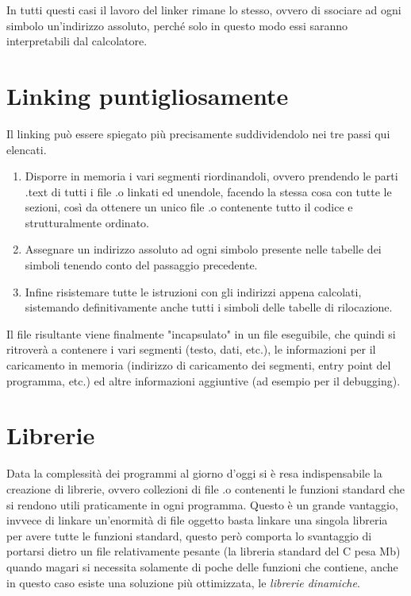 \documentclass[class=book, crop=false, oneside]{standalone}
\begin{document}
In tutti questi casi il lavoro del linker rimane lo stesso, ovvero di ssociare ad ogni simbolo un'indirizzo assoluto, perché solo in questo modo essi saranno interpretabili dal calcolatore.

\section{Linking puntigliosamente}
Il linking può essere spiegato più precisamente suddividendolo nei tre passi qui elencati.
\begin{enumerate}
	\item Disporre in memoria i vari segmenti riordinandoli, ovvero prendendo le parti .text di tutti i file .o linkati ed unendole, facendo la stessa cosa con tutte le sezioni, così da ottenere un unico file .o contenente tutto il codice e strutturalmente ordinato.
	\item Assegnare un indirizzo assoluto ad ogni simbolo presente nelle tabelle dei simboli tenendo conto del passaggio precedente.
	\item Infine risistemare tutte le istruzioni con gli indirizzi appena calcolati, sistemando definitivamente anche tutti i simboli delle tabelle di rilocazione.
\end{enumerate}

Il file risultante viene finalmente "incapsulato" in un file eseguibile, che quindi si ritroverà a contenere i vari segmenti (testo, dati, etc.), le informazioni per il caricamento in memoria (indirizzo di caricamento dei segmenti, entry point del programma, etc.) ed altre informazioni aggiuntive (ad esempio per il debugging).

\section{Librerie}
Data la complessità dei programmi al giorno d'oggi si è resa indispensabile la creazione di librerie, ovvero collezioni di file .o contenenti le funzioni standard che si rendono utili praticamente in ogni  programma.
Questo è un grande vantaggio, invvece di linkare un'enormità di file oggetto basta linkare una singola libreria per avere tutte le funzioni standard, questo però comporta lo svantaggio di portarsi dietro un file relativamente pesante (la libreria standard del C pesa \unit[2,5]{Mb}) quando magari si necessita solamente di poche delle funzioni che contiene, anche in questo caso esiste una soluzione più ottimizzata, le \emph{librerie dinamiche}.
\end{document}
